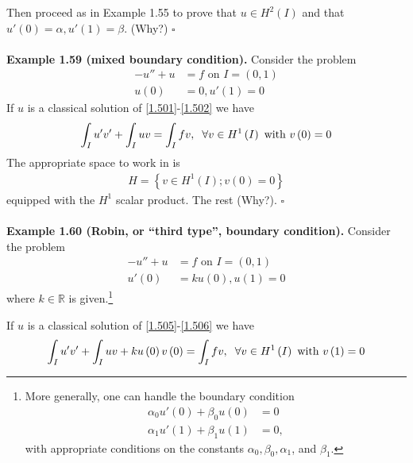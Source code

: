 \documentclass[a4paper,oneside]{article}
\numberwithin{equation}{section}
\begin{document}
Then proceed as in Example 1.55 to prove that $u\in H^2\left(I\right)$ and that $u'\left(0\right)=\alpha,u'\left(1\right)=\beta$. (Why?) \hfill $\square$\\
\\
\textbf{Example 1.59 (mixed boundary condition).} Consider the problem
\begin{align}
\label{1.501}
 - u'' + u &= f\mbox{ on } I = \left( {0,1} \right)\\
u\left( 0 \right) &= 0,u'\left( 1 \right) = 0 \label{1.502}
\end{align} 
If $u$ is a classical solution of \eqref{1.501}-\eqref{1.502} we have
\begin{align}
\int_I {u'v'}  + \int_I {uv}  = \int_I {fv} ,\hspace{0.2cm}\forall v \in {H^1}\left( I \right)\mbox{ with } v\left( 0 \right) = 0
\end{align}
The appropriate space to work in is
\begin{align}
H = \left\{ {v \in {H^1}\left( I \right);v\left( 0 \right) = 0} \right\}
\end{align}
equipped with the $H^1$ scalar product. The rest (Why?). \hfill $\square$\\
\\
\textbf{Example 1.60 (Robin, or ``third type'', boundary condition).} Consider the problem
\begin{align}
\label{1.505}
 - u'' + u &= f\mbox{ on } I = \left( {0,1} \right)\\
u'\left( 0 \right) &= ku\left( 0 \right),u\left( 1 \right) = 0 \label{1.506}
\end{align}
where $k\in \mathbb{R}$ is given.\footnote{More generally, one can handle the boundary condition
\begin{align}
{\alpha _0}u'\left( 0 \right) + {\beta _0}u\left( 0 \right) &= 0\\
{\alpha _1}u'\left( 1 \right) + {\beta _1}u\left( 1 \right) &= 0,
\end{align}
with appropriate conditions on the constants $\alpha _0,\beta _0,\alpha _1$, and $\beta _1$.}

If $u$ is a classical solution of \eqref{1.505}-\eqref{1.506} we have
\begin{align}
\int_I {u'v'}  + \int_I {uv}  + ku\left( 0 \right)v\left( 0 \right) = \int_I {fv} ,\hspace{0.2cm}\forall v \in {H^1}\left( I \right)\mbox{ with } v\left( 1 \right) = 0
\end{align}
\end{document}
